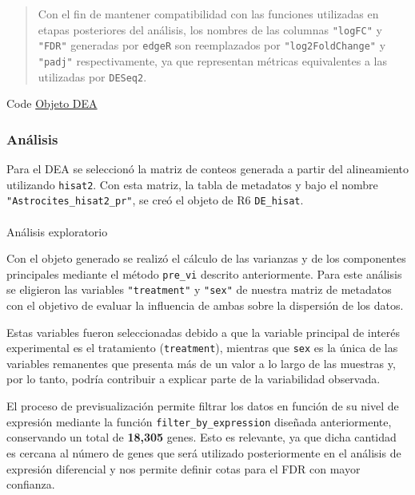 \documentclass[
  9pt,
]{article}
\makeatletter
\let\oldparagraph\paragraph
\renewcommand{\paragraph}{
    \@ifstar
      \xxxParagraphStar
      \xxxParagraphNoStar
  }
\newcommand{\xxxParagraphStar}[1]{\oldparagraph*{#1}\mbox{}}
\newcommand{\xxxParagraphNoStar}[1]{\oldparagraph{#1}\mbox{}}
\makeatother
\begin{document}
\begin{quote}
Con el fin de mantener compatibilidad con las funciones utilizadas en
etapas posteriores del análisis, los nombres de las columnas
\texttt{"logFC"} y \texttt{"FDR"} generadas por \texttt{edgeR} son
reemplazados por \texttt{"log2FoldChange"} y \texttt{"padj"}
respectivamente, ya que representan métricas equivalentes a las
utilizadas por \texttt{DESeq2}.
\end{quote}

Code \hyperref[DEA_obj]{Objeto DEA}

\subsubsection{Análisis}\label{anuxe1lisis}

Para el DEA se seleccionó la matriz de conteos generada a partir del
alineamiento utilizando \texttt{hisat2}. Con esta matriz, la tabla de
metadatos y bajo el nombre \texttt{"Astrocites\_hisat2\_pr"}, se creó el
objeto de R6 \texttt{DE\_hisat}.

\paragraph{Análisis exploratorio}\label{anuxe1lisis-exploratorio}

Con el objeto generado se realizó el cálculo de las varianzas y de los
componentes principales mediante el método \texttt{pre\_vi} descrito
anteriormente. Para este análisis se eligieron las variables
\texttt{"treatment"} y \texttt{"sex"} de nuestra matriz de metadatos con
el objetivo de evaluar la influencia de ambas sobre la dispersión de los
datos.

Estas variables fueron seleccionadas debido a que la variable principal
de interés experimental es el tratamiento (\texttt{treatment}), mientras
que \texttt{sex} es la única de las variables remanentes que presenta
más de un valor a lo largo de las muestras y, por lo tanto, podría
contribuir a explicar parte de la variabilidad observada.

El proceso de previsualización permite filtrar los datos en función de
su nivel de expresión mediante la función
\texttt{filter\_by\_expression} diseñada anteriormente, conservando un
total de \textbf{18,305} genes. Esto es relevante, ya que dicha cantidad
es cercana al número de genes que será utilizado posteriormente en el
análisis de expresión diferencial y nos permite definir cotas para el
FDR con mayor confianza.
\end{document}
